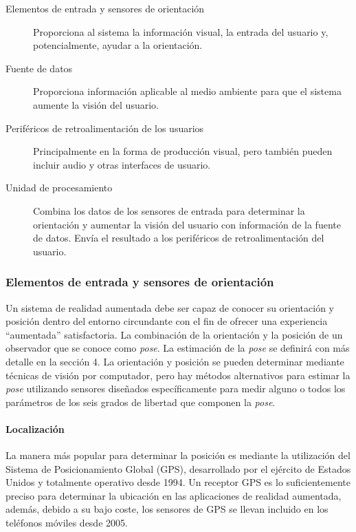 \begin{description}

\item[Elementos de entrada y sensores de orientación] Proporciona al sistema la información visual, la entrada del usuario y, potencialmente, ayudar a la orientación.

\item[Fuente de datos] Proporciona información aplicable al medio ambiente para que el sistema aumente la visión del usuario.

\item[Periféricos de retroalimentación de los usuarios] Principalmente en la forma de producción visual, pero también pueden incluir audio y otras interfaces de usuario.

\item[Unidad de procesamiento] Combina los datos de los sensores de entrada para determinar la orientación y aumentar la visión del usuario con información de la fuente de datos. Envía el resultado a los periféricos de retroalimentación del usuario.
\end{description}

\subsubsection{Elementos de entrada y sensores de orientación}
Un sistema de realidad aumentada debe ser capaz de conocer su orientación y posición dentro del entorno circundante con el fin de ofrecer una experiencia ``aumentada'' satisfactoria. La combinación de la orientación y la posición de un observador que se conoce como \emph{pose}. La estimación de la \emph{pose} se definirá con más detalle en la sección 4. La orientación y posición se pueden determinar mediante técnicas de visión por computador, pero hay métodos alternativos para estimar la \emph{pose}  utilizando  sensores diseñados específicamente para medir alguno o todos los parámetros de los seis grados de libertad que componen la \emph{pose}.

\paragraph{Localización}
La manera más popular para determinar la posición es mediante la utilización del Sistema de Posicionamiento Global (GPS), desarrollado por el ejército de Estados Unidos y totalmente operativo desde 1994. 
Un receptor GPS es lo suficientemente preciso para determinar la ubicación en las aplicaciones de realidad aumentada, además, debido a su bajo coste, los sensores de GPS se llevan incluido en los teléfonos móviles desde 2005.

